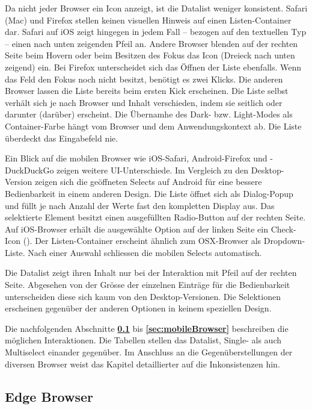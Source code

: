 Da nicht jeder Browser ein Icon anzeigt, ist die Datalist weniger konsistent.
Safari (Mac) und Firefox stellen keinen visuellen Hinweis auf einen Listen-Container dar.
Safari auf iOS zeigt hingegen in jedem Fall – bezogen auf den textuellen Typ – einen nach unten zeigenden Pfeil an.
Andere Browser blenden auf der rechten Seite beim Hovern oder beim Besitzen des Fokus das Icon (Dreieck nach unten zeigend) ein.
Bei Firefox unterscheidet sich das Öffnen der Liste ebenfalls. 
Wenn das Feld den Fokus noch nicht besitzt, benötigt es zwei Klicks.
Die anderen Browser lassen die Liste bereits beim ersten Kick erscheinen.
Die Liste selbst verhält sich je nach Browser und Inhalt verschieden, indem sie seitlich oder darunter (darüber) erscheint.
Die Übernamhe des Dark- bzw. Light-Modes als Container-Farbe hängt vom Browser und dem Anwendungskontext ab.
Die Liste überdeckt das Eingabefeld nie. 

Ein Blick auf die mobilen Browser wie iOS-Safari, Android-Firefox und -DuckDuckGo zeigen weitere UI-Unterschiede.
Im Vergleich zu den Desktop-Version zeigen sich die geöffneten Selects auf Android für eine bessere Bedienbarkeit in einem anderen Design.
Die Liste öffnet sich als Dialog-Popup und füllt je nach Anzahl der Werte fast den kompletten Display aus.
Das selektierte Element besitzt einen ausgefüllten Radio-Button auf der rechten Seite. 
Auf iOS-Browser erhält die ausgewählte Option auf der linken Seite ein Check-Icon (\cmark).
Der Listen-Container erscheint ähnlich zum OSX-Browser als Dropdown-Liste.
Nach einer Auswahl schliessen die mobilen Selects automatisch.

Die Datalist zeigt ihren Inhalt nur bei der Interaktion mit Pfeil auf der rechten Seite.
Abgesehen von der Grösse der einzelnen Einträge für die Bedienbarkeit unterscheiden diese sich kaum von den Desktop-Versionen.
Die Selektionen erscheinen gegenüber der anderen Optionen in keinem speziellen Design.

Die nachfolgenden Abschnitte \textbf{\ref{sec:edgeBrowser}} bis \textbf{\ref{sec:mobileBrowser}} beschreiben die möglichen Interaktionen.
Die Tabellen stellen das Datalist, Single- als auch Multiselect einander gegenüber.
Im Anschluss an die Gegenüberstellungen der diversen Browser weist das Kapitel \textbf{} detaillierter auf die Inkonsistenzen hin. 


\clearpage
\subsection{Edge Browser}
\label{sec:edgeBrowser}

